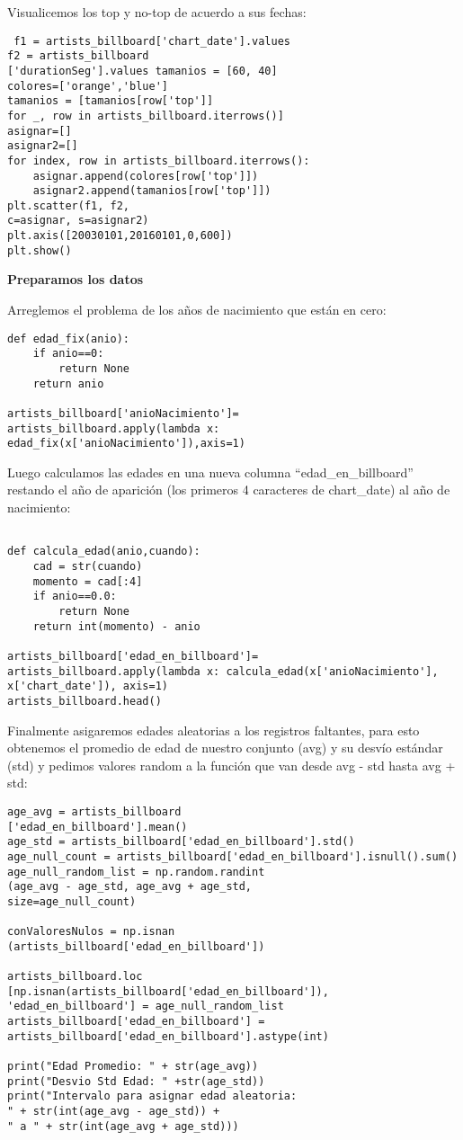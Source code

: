 \documentclass{article}
\begin{document}
Visualicemos los top y no-top de acuerdo a sus fechas:
\begin{lstlisting}
 f1 = artists_billboard['chart_date'].values
f2 = artists_billboard
['durationSeg'].values tamanios = [60, 40]
colores=['orange','blue'] 
tamanios = [tamanios[row['top']] 
for _, row in artists_billboard.iterrows()]
asignar=[]
asignar2=[]
for index, row in artists_billboard.iterrows():
    asignar.append(colores[row['top']])
    asignar2.append(tamanios[row['top']])
plt.scatter(f1, f2,
c=asignar, s=asignar2)
plt.axis([20030101,20160101,0,600])
plt.show()
\end{lstlisting}


\textbf{Preparamos los datos}



Arreglemos el problema de los años de nacimiento que están en cero:
\begin{lstlisting}
def edad_fix(anio):
    if anio==0:
        return None
    return anio

artists_billboard['anioNacimiento']=
artists_billboard.apply(lambda x:
edad_fix(x['anioNacimiento']),axis=1)
\end{lstlisting}

Luego calculamos las edades en una nueva columna ``edad\_en\_billboard'' restando el año de aparición (los primeros 4 caracteres de chart\_date) al año de nacimiento:
\begin{lstlisting}
    
def calcula_edad(anio,cuando):
    cad = str(cuando)
    momento = cad[:4]
    if anio==0.0:
        return None
    return int(momento) - anio

artists_billboard['edad_en_billboard']=
artists_billboard.apply(lambda x: calcula_edad(x['anioNacimiento'],
x['chart_date']), axis=1)
artists_billboard.head()
\end{lstlisting}

Finalmente asigaremos edades aleatorias a los registros faltantes, para esto obtenemos el promedio de edad de nuestro conjunto (avg) y su desvío estándar (std) y pedimos valores random a la función que van desde avg - std hasta avg + std:
\begin{lstlisting}
age_avg = artists_billboard
['edad_en_billboard'].mean()
age_std = artists_billboard['edad_en_billboard'].std()
age_null_count = artists_billboard['edad_en_billboard'].isnull().sum() 
age_null_random_list = np.random.randint
(age_avg - age_std, age_avg + age_std, 
size=age_null_count)

conValoresNulos = np.isnan
(artists_billboard['edad_en_billboard'])

artists_billboard.loc
[np.isnan(artists_billboard['edad_en_billboard']),
'edad_en_billboard'] = age_null_random_list
artists_billboard['edad_en_billboard'] = 
artists_billboard['edad_en_billboard'].astype(int)

print("Edad Promedio: " + str(age_avg))
print("Desvio Std Edad: " +str(age_std))
print("Intervalo para asignar edad aleatoria: 
" + str(int(age_avg - age_std)) + 
" a " + str(int(age_avg + age_std)))
\end{lstlisting}
\end{document}
